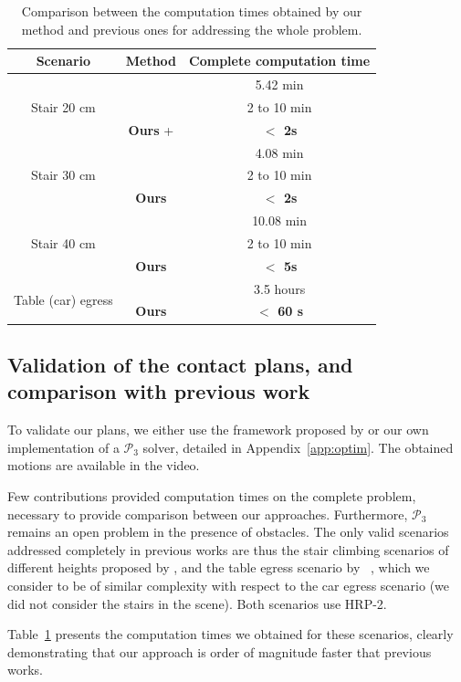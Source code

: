 \begin{table}
\centering
\begin{tabular}{ c | c | c }
 Scenario & Method  & Complete computation time \\
 \hline
   \multirow{3}{*}{Stair 20 cm} & \citeauthor{Hauser06usingmotion} &  5.42 min  \\							 
							  & \citeauthor{Mordatch:2012:DCB:2185520.2185539} & 2 to 10 min \\
							 & \textbf{Ours} + \citeauthor{Carpentier2016}  & \textbf{$ <$ 2s} \\
 \hline
   \multirow{3}{*}{Stair 30 cm} & \citeauthor{Hauser06usingmotion} &  4.08 min  \\
							 & \citeauthor{Mordatch:2012:DCB:2185520.2185539} & 2 to 10 min \\
							 & \textbf{Ours}  & \textbf{$ <$ 2s}   \\
 \hline
   \multirow{3}{*}{Stair 40 cm} & \citeauthor{Hauser06usingmotion} &  10.08 min  \\
							 & \citeauthor{Mordatch:2012:DCB:2185520.2185539} & 2 to 10 min \\
							 & \textbf{Ours}   & \textbf{$ <$ 5s}   \\
 \hline
   \multirow{2}{*}{Table (car) egress} & \citeauthor{Bouyarmane2009, DBLP:conf/iser/EscandeKMG08} & 3.5 hours  \\
							 & \textbf{Ours}  & \textbf{$<$ 60 s} \\
							 
 \end{tabular}
\caption{Comparison between the computation times obtained by our method and previous ones for addressing the whole problem.}
\label{tab:compprev}
\quad
\end{table}

\subsection{Validation of the contact plans, and comparison with previous work} \label{sec:compa}
To validate our plans, we either use the framework proposed by \citeauthor{Carpentier2016} or our own implementation of a $\mathcal{P}_3$ solver, detailed in Appendix~\ref{app:optim}.
The obtained motions are available in the video.

Few contributions provided computation times on the complete problem, necessary to provide comparison between our approaches. 
Furthermore, $\mathcal{P}_3$ remains an open problem in the presence of obstacles. The only valid scenarios addressed completely in previous works are thus the stair climbing scenarios of different heights proposed by \citeauthor{Hauser06usingmotion}, and the table egress scenario by ~\citeauthor{DBLP:conf/iser/EscandeKMG08}, which we consider to be of similar complexity with respect to the car egress scenario (we did not consider the stairs in the scene). Both scenarios use HRP-2.

Table~\ref{tab:compprev} presents the computation times we obtained for these scenarios, clearly demonstrating that our approach is order of magnitude faster that previous works.



